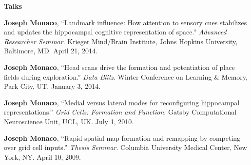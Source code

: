 \documentclass[10pt]{article}
\begin{document}
\begin{description}
\item \textbf{Talks}\nopagebreak
\item[\quad] \textbf{Joseph Monaco}, ``Landmark influence: How attention to sensory cues stabilizes and updates the hippocampal cognitive representation of space.'' \emph{Advanced Researcher Seminar}. Krieger Mind/Brain Institute, Johns Hopkins University, Baltimore, MD. April 21, 2014.
\item[\quad] \textbf{Joseph Monaco}, ``Head scans drive the formation and potentiation of place fields during exploration.'' \emph{Data Blitz}. Winter Conference on Learning \& Memory, Park City, UT. January 3, 2014.
\item[\quad] \textbf{Joseph Monaco}, ``Medial versus lateral modes for reconfiguring hippocampal representations.'' \emph{Grid Cells: Formation and Function}. Gatsby Computational Neuroscience Unit, UCL, UK. July 1, 2010.
\item[\quad] \textbf{Joseph Monaco}, ``Rapid spatial map formation and remapping by competing over grid cell inputs.'' \emph{Thesis Seminar}. Columbia University Medical Center, New York, NY. April 10, 2009.
\end{description}
\end{document}
